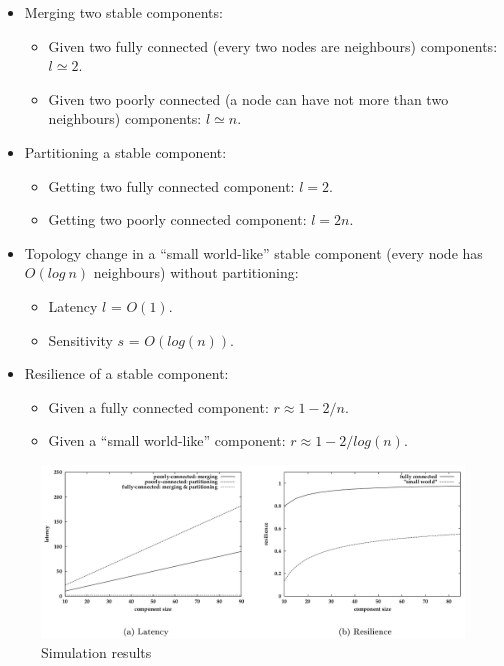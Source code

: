 \begin{itemize}
	\item Merging two stable components:
	
	\begin{itemize}
		\item Given two fully connected (every two nodes are neighbours) components: $l \simeq 2$.
		\item Given two poorly connected (a node can have not more than two neighbours) components: $l \simeq n$.
	\end{itemize}
	
	\item Partitioning a stable component:
	
	\begin{itemize}
		\item Getting two fully connected component: $l = 2$.
		\item Getting two poorly connected component: $l = 2n$.
	\end{itemize}
	
	\item Topology change in a “small world-like” stable component (every node has $O(log~n)$ neighbours) without partitioning:
	\begin{itemize}
		\item Latency $l$ = $O(1)$.
		\item Sensitivity $s$ = $O(log(n))$.
	\end{itemize}
	
	\item Resilience of a stable component:
	
	\begin{itemize}
		\item Given a fully connected component: $r \approx 1 - 2/n$.
		\item Given a “small world-like” component: $r \approx 1 - 2/log(n)$.
	\end{itemize}
	
\end{itemize}


\begin{figure}[hbtp]
	\centering
	\includegraphics[scale=.4]{performance_test.png}
	\caption{Simulation results}
\end{figure}
